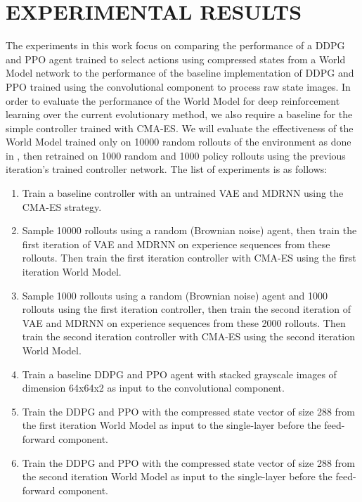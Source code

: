 \section{EXPERIMENTAL RESULTS} \label{experiments}

The experiments in this work focus on comparing the performance of a DDPG and PPO agent trained to select actions using compressed states from a World Model network to the performance of the baseline implementation of DDPG and PPO trained using the convolutional component to process raw state images. In order to evaluate the performance of the World Model for deep reinforcement learning over the current evolutionary method, we also require a baseline for the simple controller trained with CMA-ES. We will evaluate the effectiveness of the World Model trained only on 10000 random rollouts of the environment as done in \cite{1.0.0}, then retrained on 1000 random and 1000 policy rollouts using the previous iteration's trained controller network. The list of experiments is as follows:

\begin{enumerate}
	\item Train a baseline controller with an untrained VAE and MDRNN using the CMA-ES strategy.
	\item Sample 10000 rollouts using a random (Brownian noise) agent, then train the first iteration of VAE and MDRNN on experience sequences from these rollouts. Then train the first iteration controller with CMA-ES using the first iteration World Model.
	\item Sample 1000 rollouts using a random (Brownian noise) agent and 1000 rollouts using the first iteration controller, then train the second iteration of VAE and MDRNN on experience sequences from these 2000 rollouts. Then train the second iteration controller with CMA-ES using the second iteration World Model.
	\item Train a baseline DDPG and PPO agent with stacked grayscale images of dimension 64x64x2 as input to the convolutional component.
	\item Train the DDPG and PPO with the compressed state vector of size 288 from the first iteration World Model as input to the single-layer before the feed-forward component.
	\item Train the DDPG and PPO with the compressed state vector of size 288 from the second iteration World Model as input to the single-layer before the feed-forward component.
\end{enumerate}

